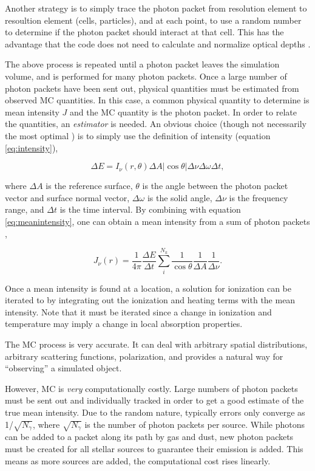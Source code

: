 Another strategy is to simply trace the photon packet from resolution element to resoultion element (cells, particles), and at each point, to use a random number to determine if the photon packet should interact at that cell. This has the advantage that the code does not need to calculate and normalize optical depths \citep{lucy99,ercolanoEt03}.

The above process is repeated until a photon packet leaves the simulation volume, and is performed for many photon packets. Once a large number of photon packets have been sent out, physical quantities must be estimated from observed MC quantities. In this case, a common physical quantity to determine is mean intensity $J$ and the MC quantity is the photon packet. In order to relate the quantities, an \emph{estimator} is needed. An obvious choice (though not necessarily the most optimal \citep{ercolanoEt03}) is to simply use the definition of intensity (equation \ref{eq:intensity}),

\begin{equation}
\label{eq:mcstimator}
\Delta E = I_{\nu}(r,\theta)\Delta A |\cos{\theta}|\Delta \nu \Delta \omega \Delta t,
\end{equation}

\noindent
where $\Delta A$ is the reference surface, $\theta$ is the angle between the photon packet vector and surface normal vector, $\Delta \omega$ is the solid angle, $\Delta \nu$ is the frequency range, and $\Delta t$ is the time interval. By combining with equation \ref{eq:meanintensity}, one can obtain a mean intensity from a sum of photon packets \citep{ercolanoEt03},

\begin{equation}
\label{eq:mcmeanintensity}
J_{\nu}(r) = \frac{1}{4\pi}\frac{\Delta E}{\Delta t} \sum_i^{N_k} \frac{1}{\cos{\theta}}\frac{1}{\Delta A}\frac{1}{\Delta \nu}.
\end{equation}

Once a mean intensity is found at a location, a solution for ionization can be iterated to by integrating out the ionization and heating terms with the mean intensity. Note that it must be iterated since a change in ionization and temperature may imply a change in local absorption properties.

The MC process is very accurate. It can deal with arbitrary spatial distributions, arbitrary scattering functions, polarization, and provides a natural way for ``observing'' a simulated object.

However, MC is \emph{very} computationally costly. Large numbers of photon packets must be sent out and individually tracked in order to get a good estimate of the true mean intensity. Due to the random nature, typically errors only converge as 1/$\sqrt{N_{\gamma}}$, where $\sqrt{N_{\gamma}}$ is the number of photon packets per source. While photons can be added to a packet along its path by gas and dust, new photon packets must be created for all stellar sources to guarantee their emission is added. This means as more sources are added, the computational cost rises linearly.

